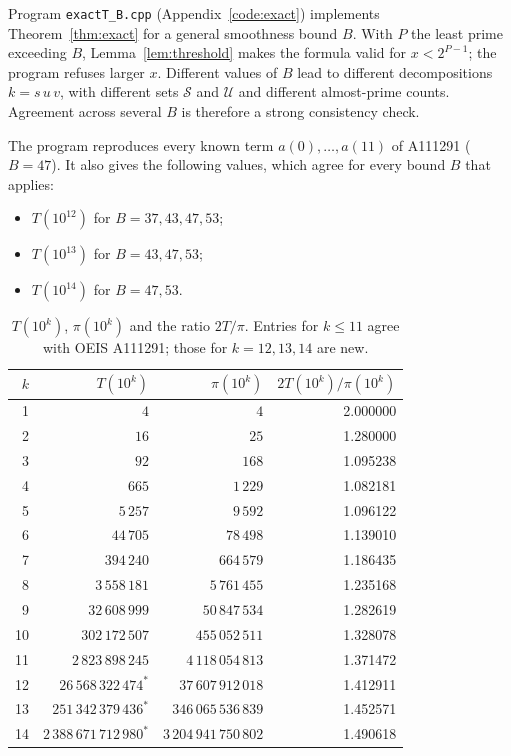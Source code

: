 \documentclass[11pt,a4paper]{article}
\theoremstyle{definition}
\newcommand{\cS}{\mathcal S}
\newcommand{\cU}{\mathcal U}
\begin{document}
Program \texttt{exactT\_B.cpp} (Appendix~\ref{code:exact}) implements Theorem~\ref{thm:exact} for a general smoothness bound $B$. With $P$ the least prime exceeding $B$, Lemma~\ref{lem:threshold} makes the formula valid for $x<2^{P-1}$; the program refuses larger $x$. Different values of $B$ lead to different decompositions $k=s\,u\,v$, with different sets $\cS$ and $\cU$ and different almost-prime counts. Agreement across several $B$ is therefore a strong consistency check.

The program reproduces every known term $a(0),\dots,a(11)$ of A111291 ($B=47$). It also gives the following values, which agree for every bound $B$ that applies:
\begin{itemize}
\item $T(10^{12})$ for $B=37,43,47,53$;
\item $T(10^{13})$ for $B=43,47,53$;
\item $T(10^{14})$ for $B=47,53$.
\end{itemize}

\begin{table}[ht]
\centering
\caption{$T(10^k)$, $\pi(10^k)$ and the ratio $2T/\pi$. Entries for $k\le11$ agree with OEIS A111291; those for $k=12,13,14$ are new.}\label{tab:values}
\begin{tabular}{rrrr}
\toprule
$k$ & $T(10^k)$ & $\pi(10^k)$ & $2T(10^k)/\pi(10^k)$\\
\midrule
1 & $4$ & $4$ & 2.000000\\
2 & $16$ & $25$ & 1.280000\\
3 & $92$ & $168$ & 1.095238\\
4 & $665$ & $1\,229$ & 1.082181\\
5 & $5\,257$ & $9\,592$ & 1.096122\\
6 & $44\,705$ & $78\,498$ & 1.139010\\
7 & $394\,240$ & $664\,579$ & 1.186435\\
8 & $3\,558\,181$ & $5\,761\,455$ & 1.235168\\
9 & $32\,608\,999$ & $50\,847\,534$ & 1.282619\\
10 & $302\,172\,507$ & $455\,052\,511$ & 1.328078\\
11 & $2\,823\,898\,245$ & $4\,118\,054\,813$ & 1.371472\\
12 & $26\,568\,322\,474^{\ast}$ & $37\,607\,912\,018$ & 1.412911\\
13 & $251\,342\,379\,436^{\ast}$ & $346\,065\,536\,839$ & 1.452571\\
14 & $2\,388\,671\,712\,980^{\ast}$ & $3\,204\,941\,750\,802$ & 1.490618\\
\bottomrule
\end{tabular}
\end{table}
\end{document}
